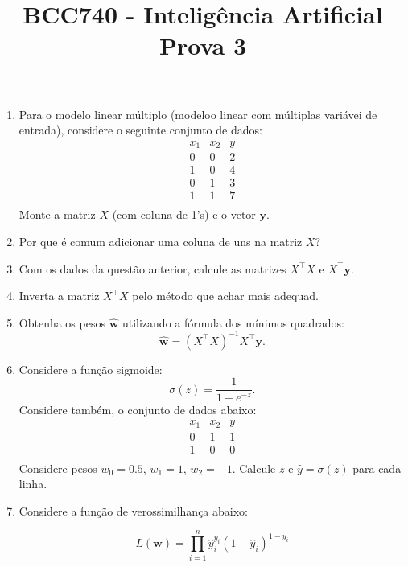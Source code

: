 \documentclass[12pt]{article}
\title{BCC740 - Inteligência Artificial \\ Prova 3}
\author{}
\date{}
\begin{document}
\maketitle

\vspace{-1.5cm}

\begin{enumerate}
    \item Para o modelo linear múltiplo (modeloo linear com múltiplas variávei de entrada), considere o seguinte conjunto de dados:
  \[
  \begin{array}{ccc}
    x_1 & x_2 & y \\
    \hline
    0 & 0 & 2 \\
    1 & 0 & 4 \\
    0 & 1 & 3 \\
    1 & 1 & 7 \\
  \end{array}
  \]
  Monte a matriz \(X\) (com coluna de 1's) e o vetor \(\bm{y}\).

  \item Por que é comum adicionar uma coluna de uns na matriz \(X\)?

  \item Com os dados da questão anterior, calcule as matrizes \(X^{\!\top}X\) e \(X^{\!\top} \bm{y}\).

  \item Inverta a matriz \(X^{\!\top}X\) pelo método que achar mais adequad.

  \item Obtenha os pesos \(\hat{\bm{w}}\) utilizando a fórmula dos mínimos quadrados:
  \[
  \hat{\bm{w}} = (X^{\!\top} X)^{-1} X^{\!\top} \bm{y}.
  \]

  \item Considere a função sigmoide:
  \[
  \sigma(z) = \frac{1}{1 + e^{-z}}.
  \]
  Considere também, o conjunto de dados abaixo:
  \[
  \begin{array}{ccc}
    x_1 & x_2 & y \\
    \hline
    0 & 1 & 1 \\
    1 & 0 & 0 \\
  \end{array}
  \]
  Considere pesos \(w_0 = 0.5\), \(w_1 = 1\), \(w_2 = -1\). Calcule \(z\) e \(\hat{y} = \sigma(z)\) para cada linha.

  \item Considere a função de verossimilhança abaixo:

  \[
    L(\bm{w}) = \prod_{i=1}^{n} \hat{y}_i^{y_i} (1 - \hat{y}_i)^{1 - y_i}
    \]
  

\end{enumerate}
\end{document}
